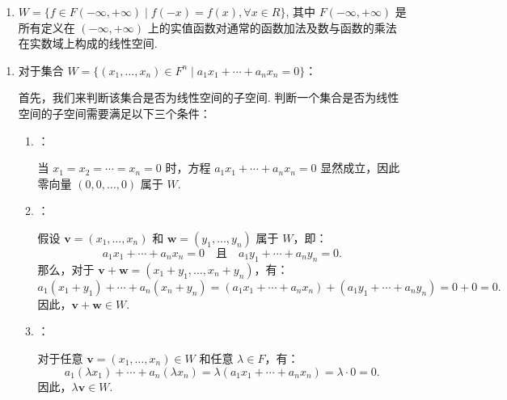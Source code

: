 \begin{exercise}
\begin{exgroup}
\begin{enumerate}
            \item $W = \{f \in F(-\infty, +\infty) \mid f(-x)=f(x), \forall x \in R\}$, 其中 $F(-\infty, +\infty)$ 是所有定义在 $(-\infty, +\infty)$ 上的实值函数对通常的函数加法及数与函数的乘法在实数域上构成的线性空间.
        \end{enumerate}

        \begin{answer}
            \begin{enumerate}
                \item 对于集合 \( W = \{(x_1, \dots, x_n) \in F^n \mid a_1x_1 + \cdots + a_nx_n = 0\} \)：

                首先，我们来判断该集合是否为线性空间的子空间. 判断一个集合是否为线性空间的子空间需要满足以下三个条件：

                \begin{enumerate}
                    \item {}：

                    当 \( x_1 = x_2 = \cdots = x_n = 0 \) 时，方程 \( a_1x_1 + \cdots + a_nx_n = 0 \) 显然成立，因此零向量 \( (0, 0, \dots, 0) \) 属于 \( W \).

                    \item {}：

                    假设 \( \mathbf{v} = (x_1, \dots, x_n) \) 和 \( \mathbf{w} = (y_1, \dots, y_n) \) 属于 \( W \)，即：
                    \[
                    a_1x_1 + \cdots + a_nx_n = 0 \quad \text{且} \quad a_1y_1 + \cdots + a_ny_n = 0.
                    \]
                    那么，对于 \( \mathbf{v} + \mathbf{w} = (x_1 + y_1, \dots, x_n + y_n) \)，有：
                    \[
                    a_1(x_1 + y_1) + \cdots + a_n(x_n + y_n) = (a_1x_1 + \cdots + a_nx_n) + (a_1y_1 + \cdots + a_ny_n) = 0 + 0 = 0.
                    \]
                    因此，\( \mathbf{v} + \mathbf{w} \in W \).

                    \item {}：

                    对于任意 \( \mathbf{v} = (x_1, \dots, x_n) \in W \) 和任意 \( \lambda \in F \)，有：
                    \[
                    a_1(\lambda x_1) + \cdots + a_n(\lambda x_n) = \lambda (a_1x_1 + \cdots + a_nx_n) = \lambda \cdot 0 = 0.
                    \]
                    因此，\( \lambda \mathbf{v} \in W \).
                \end{enumerate}


\end{enumerate}
\end{answer}
\end{exgroup}
\end{exercise}
